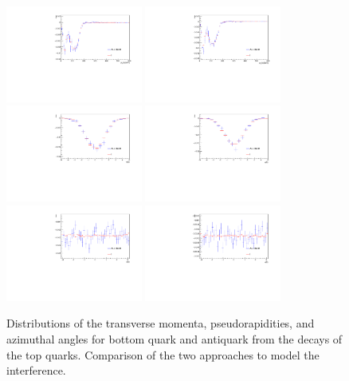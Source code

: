 \begin{figure} \centering
  \includegraphics[width=0.4\textwidth]{fig/chapt4/gen_plots/b_pt_compare.pdf}
  \includegraphics[width=0.4\textwidth]{fig/chapt4/gen_plots/bbar_pt_compare.pdf}\\
  \includegraphics[width=0.4\textwidth]{fig/chapt4/gen_plots/b_eta_compare.pdf}
  \includegraphics[width=0.4\textwidth]{fig/chapt4/gen_plots/bbar_eta_compare.pdf}\\
  \includegraphics[width=0.4\textwidth]{fig/chapt4/gen_plots/b_phi_compare.pdf}
  \includegraphics[width=0.4\textwidth]{fig/chapt4/gen_plots/bbar_phi_compare.pdf}
  \caption{Distributions of the transverse momenta, pseudorapidities, and azimuthal angles for bottom quark and antiquark from the decays of the top quarks. Comparison of the two approaches to model the interference.}
  \label{fig:comparison_b}
\end{figure}

